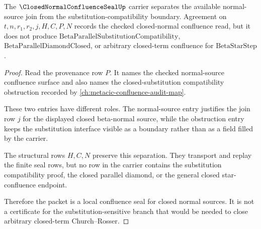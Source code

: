 \begin{theorem}
\label{thm:closed-normal-confluence-seal-substitution-boundary}
The $\ClosedNormalConfluenceSealUp$ carrier separates the available
normal-source join from the substitution-compatibility boundary. Agreement on
$t,n,r_1,r_2,j,H,C,P,N$ records the checked closed-normal confluence read, but
it does not produce $\mathrm{BetaParallelSubstitutionCompatibility}$,
$\mathrm{BetaParallelDiamondClosed}$, or arbitrary closed-term confluence for
$\mathrm{BetaStarStep}$.
\end{theorem}
\begin{proof}
Read the provenance row $P$. It names the checked normal-source confluence
surface and also names the closed-substitution compatibility obstruction
recorded by \autoref{ch:metacic-confluence-audit-map}.

These two entries have different roles. The normal-source entry justifies the
join row $j$ for the displayed closed beta-normal source, while the obstruction
entry keeps the substitution interface visible as a boundary rather than as a
field filled by the carrier.

The structural rows $H,C,N$ preserve this separation. They transport and replay
the finite seal rows, but no row in the carrier contains the substitution
compatibility proof, the closed parallel diamond, or the general closed
star-confluence endpoint.

Therefore the packet is a local confluence seal for closed normal sources. It
is not a certificate for the substitution-sensitive branch that would be needed
to close arbitrary closed-term Church--Rosser.
\end{proof}


